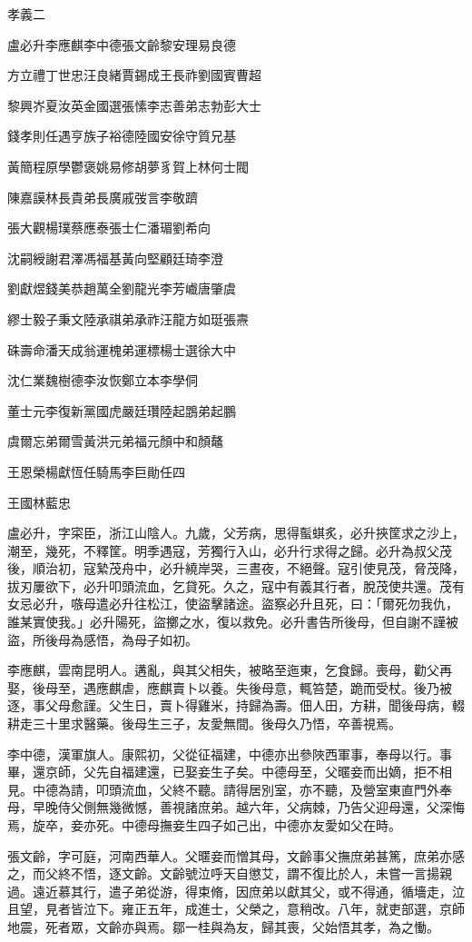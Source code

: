 
\begin{pinyinscope}
孝義二

盧必升李應麒李中德張文齡黎安理易良德

方立禮丁世忠汪良緒賈錫成王長祚劉國賓曹超

黎興岕夏汝英金國選張愫李志善弟志勃彭大士

錢孝則任遇亨族子裕德陸國安徐守質兄基

黃簡程原學鬱褒姚易修胡夢豸賀上林何士閥

陳嘉謨林長貴弟長廣戚弢言李敬躋

張大觀楊璞蔡應泰張士仁潘瑂劉希向

沈嗣綬謝君澤馮福基黃向堅顧廷琦李澄

劉獻煜錢美恭趙萬全劉龍光李芳巇唐肇虞

繆士毅子秉文陸承祺弟承祚汪龍方如珽張燾

硃壽命潘天成翁運槐弟運標楊士選徐大中

沈仁業魏樹德李汝恢鄭立本李學侗

董士元李復新黨國虎嚴廷瓚陸起鵾弟起鵬

虞爾忘弟爾雪黃洪元弟福元顏中和顏鼇

王恩榮楊獻恆任騎馬李巨勛任四

王國林藍忠

盧必升，字寀臣，浙江山陰人。九歲，父芳病，思得蟚蜞炙，必升挾筐求之沙上，潮至，幾死，不釋筐。明季遇寇，芳獨行入山，必升行求得之歸。必升為叔父茂後，順治初，寇縶茂舟中，必升繞岸哭，三晝夜，不絕聲。寇引使見茂，脅茂降，拔刃屢欲下，必升叩頭流血，乞貸死。久之，寇中有義其行者，脫茂使共還。茂有女忌必升，嗾母遣必升往松江，使盜擊諸途。盜察必升且死，曰：「爾死勿我仇，誰某實使我。」必升陽死，盜擲之水，復以救免。必升書告所後母，但自謝不謹被盜，所後母為感悟，為母子如初。

李應麒，雲南昆明人。遘亂，與其父相失，被略至迤東，乞食歸。喪母，勸父再娶，後母至，遇應麒虐，應麒賣卜以養。失後母意，輒笞楚，跪而受杖。後乃被逐，事父母愈謹。父生日，賣卜得雞米，持歸為壽。佃人田，方耕，聞後母病，輟耕走三十里求醫藥。後母生三子，友愛無間。後母久乃悟，卒善視焉。

李中德，漢軍旗人。康熙初，父從征福建，中德亦出參陜西軍事，奉母以行。事畢，還京師，父先自福建還，已娶妾生子矣。中德母至，父暱妾而出嫡，拒不相見。中德為請，叩頭流血，父終不聽。請得居別室，亦不聽，及營室東直門外奉母，早晚侍父側無幾微憾，善視諸庶弟。越六年，父病棘，乃告父迎母還，父深悔焉，旋卒，妾亦死。中德母撫妾生四子如己出，中德亦友愛如父在時。

張文齡，字可庭，河南西華人。父暱妾而憎其母，文齡事父撫庶弟甚篤，庶弟亦感之，而父終不悟，逐文齡。文齡號泣呼天自懲艾，謂不復比於人，未嘗一言揚親過。遠近慕其行，遣子弟從游，得束脩，因庶弟以獻其父，或不得通，循墻走，泣且望，見者皆泣下。雍正五年，成進士，父榮之，意稍改。八年，就吏部選，京師地震，死者眾，文齡亦與焉。鄒一桂與為友，歸其喪，父始悟其孝，為之慟。


\end{pinyinscope}
